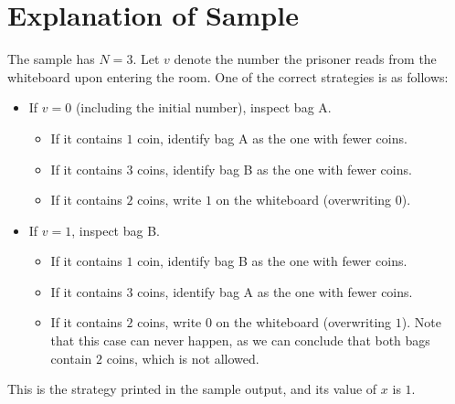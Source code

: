 \section*{Explanation of Sample}
The sample has $N = 3$. Let $v$ denote the number the prisoner reads from the whiteboard upon entering
the room. One of the correct strategies is as follows:
\begin{itemize}
  \item If $v = 0$ (including the initial number), inspect bag A.
  \begin{itemize}
    \item If it contains $1$ coin, identify bag A as the one with fewer coins.
    \item If it contains $3$ coins, identify bag B as the one with fewer coins.
    \item If it contains $2$ coins, write $1$ on the whiteboard (overwriting $0$).
  \end{itemize}
  \item If $v = 1$, inspect bag B.
  \begin{itemize}
    \item If it contains $1$ coin, identify bag B as the one with fewer coins.
    \item If it contains $3$ coins, identify bag A as the one with fewer coins.
    \item If it contains $2$ coins, write $0$ on the whiteboard (overwriting $1$). Note that this case
    can never happen, as we can conclude that both bags contain $2$ coins, which is not allowed.
  \end{itemize}
\end{itemize}

This is the strategy printed in the sample output, and its value of $x$ is $1$.
